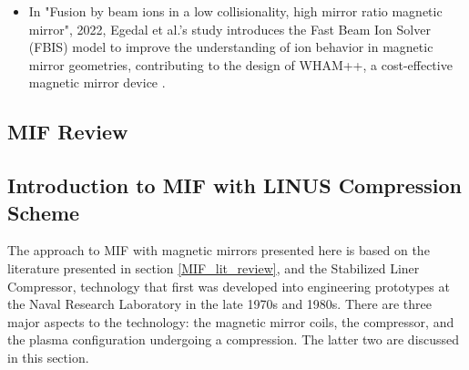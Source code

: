 \begin{itemize}
 \item In "Fusion by beam ions in a low collisionality, high mirror ratio magnetic mirror", 2022, Egedal et al.'s study introduces the Fast Beam Ion Solver (FBIS) model to improve the understanding of ion behavior in magnetic mirror geometries, contributing to the design of WHAM++, a cost-effective magnetic mirror device \cite{egedal2022fusion}.

\end{itemize}
\label{MIF_lit_review}

\subsection{MIF Review}

\subsection{Introduction to MIF with LINUS Compression Scheme}

The approach to MIF with magnetic mirrors presented here is based on the literature presented in section \ref{MIF_lit_review}, and the Stabilized Liner Compressor, technology that first was developed into engineering prototypes at the Naval Research Laboratory in the late 1970s and 1980s.  There are three major aspects to the technology: the magnetic mirror coils, the compressor, and the plasma configuration undergoing a compression. The latter two are discussed in this section.\\


